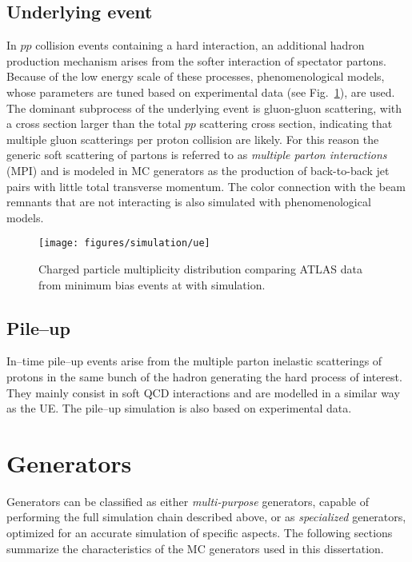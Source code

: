 \subsection{Underlying event}
\label{sec:underlyingevent}

In $pp$ collision events containing a hard interaction, an additional
hadron production mechanism arises from the softer interaction of
spectator partons. Because of the low energy scale of these processes,
phenomenological models, whose parameters are tuned based on
experimental data (see Fig.~\ref{fig:ue}), are used. 
The dominant subprocess of the underlying event is gluon-gluon
scattering, with a cross section larger than the total $pp$ scattering
cross section, indicating that multiple gluon scatterings per proton
collision are likely. 
For this reason the generic soft scattering of partons is referred to
as {\it multiple parton interactions} (MPI) and is modeled in MC
generators as the production of back-to-back jet pairs with little
total transverse momentum. 
The color connection with the beam remnants that are not
interacting is also simulated with phenomenological models.

\begin{figure}[htb]\centering
  \texttt{[image: figures/simulation/ue]}
\caption{Charged particle multiplicity distribution comparing ATLAS
  data from minimum bias events at \seventev{} with \pythia{}
  simulation.}
\label{fig:ue}
\end{figure}

\subsection{Pile--up}
\label{sec:MCpileup}

In--time pile--up events arise from the multiple parton inelastic scatterings 
of protons in the same bunch of the hadron generating the hard process
of interest. They mainly consist in soft QCD interactions and are
modelled in a similar way as the UE. 
The pile--up simulation is also based on experimental data.

\section{Generators}
\label{sec:generators}

Generators can be classified as either {\it multi-purpose}
generators, capable of performing the full simulation chain described
above, or as {\it specialized} generators, optimized for
an accurate simulation of specific aspects.
The following sections summarize the characteristics of the MC
generators used in this dissertation.

